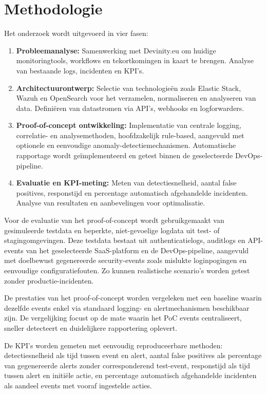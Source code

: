 \section{Methodologie}%
\label{sec:methodologie}
Het onderzoek wordt uitgevoerd in vier fasen:
\begin{enumerate}
    \item \textbf{Probleemanalyse:} Samenwerking met Devinity.eu om huidige monitoringtools, workflows en tekortkomingen in kaart te brengen. Analyse van bestaande logs, incidenten en KPI’s.
    \item \textbf{Architectuurontwerp:} Selectie van technologieën zoals Elastic Stack, Wazuh en OpenSearch voor het verzamelen, normaliseren en analyseren van data. Definiëren van datastromen via API’s, webhooks en logforwarders.
    \item \textbf{Proof-of-concept ontwikkeling:} Implementatie van centrale logging, correlatie- en analysemethoden, hoofdzakelijk rule-based, aangevuld met optionele en eenvoudige anomaly-detectiemechanismen. Automatische rapportage wordt geïmplementeerd en getest binnen de geselecteerde DevOps-pipeline.
    \item \textbf{Evaluatie en KPI-meting:} Meten van detectiesnelheid, aantal false positives, responstijd en percentage automatisch afgehandelde incidenten. Analyse van resultaten en aanbevelingen voor optimalisatie.
\end{enumerate}

Voor de evaluatie van het proof-of-concept wordt gebruikgemaakt van gesimuleerde testdata en beperkte, niet-gevoelige logdata uit test- of stagingomgevingen. 
Deze testdata bestaat uit authenticatielogs, auditlogs en API-events van het geselecteerde SaaS-platform en de DevOps-pipeline, aangevuld met doelbewust gegenereerde 
security-events zoals mislukte loginpogingen en eenvoudige configuratiefouten. Zo kunnen realistische scenario’s worden getest zonder productie-incidenten.

De prestaties van het proof-of-concept worden vergeleken met een baseline waarin dezelfde events enkel via standaard logging- en alertmechanismen beschikbaar zijn. 
De vergelijking focust op de mate waarin het PoC events centraliseert, sneller detecteert en duidelijkere rapportering oplevert.

De KPI’s worden gemeten met eenvoudig reproduceerbare methoden: detectiesnelheid als tijd tussen event en alert, aantal false positives als percentage van gegenereerde 
alerts zonder corresponderend test-event, responstijd als tijd tussen alert en initiële actie, en percentage automatisch afgehandelde incidenten als aandeel events met vooraf ingestelde acties.

